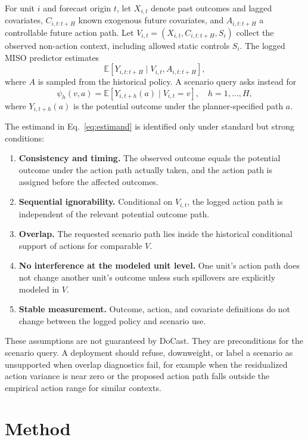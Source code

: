 \documentclass[11pt]{article}
\newcommand{\E}{\mathbb{E}}
\begin{document}
For unit $i$ and forecast origin $t$, let $X_{i,t}$ denote past outcomes and
lagged covariates, $C_{i,t:t+H}$ known exogenous future covariates, and
$A_{i,t:t+H}$ a controllable future action path. Let
$V_{i,t}=(X_{i,t},C_{i,t:t+H},S_i)$ collect the observed non-action context,
including allowed static controls $S_i$. The logged MISO predictor estimates
\begin{equation}
  \E[Y_{i,t:t+H}\mid V_{i,t}, A_{i,t:t+H}],
\end{equation}
where $A$ is sampled from the historical policy. A scenario query asks instead
for
\begin{equation}
  \psi_h(v,a) =
  \E\!\left[Y_{i,t+h}(a)\mid V_{i,t}=v\right],
  \quad h=1,\ldots,H,
  \label{eq:estimand}
\end{equation}
where $Y_{i,t+h}(a)$ is the potential outcome under the planner-specified path
$a$.

The estimand in Eq.~\ref{eq:estimand} is identified only under standard but
strong conditions:
\begin{enumerate}[leftmargin=1.3em,label=A\arabic*.]
  \item \textbf{Consistency and timing.} The observed outcome equals the
  potential outcome under the action path actually taken, and the action path
  is assigned before the affected outcomes.
  \item \textbf{Sequential ignorability.} Conditional on $V_{i,t}$, the logged
  action path is independent of the relevant potential outcome path.
  \item \textbf{Overlap.} The requested scenario path lies inside the
  historical conditional support of actions for comparable $V$.
  \item \textbf{No interference at the modeled unit level.} One unit's action
  path does not change another unit's outcome unless such spillovers are
  explicitly modeled in $V$.
  \item \textbf{Stable measurement.} Outcome, action, and covariate definitions
  do not change between the logged policy and scenario use.
\end{enumerate}
These assumptions are not guaranteed by DoCast. They are preconditions for the
scenario query. A deployment should refuse, downweight, or label a scenario as
unsupported when overlap diagnostics fail, for example when the residualized
action variance is near zero or the proposed action path falls outside the
empirical action range for similar contexts.

\section{Method}
\end{document}
